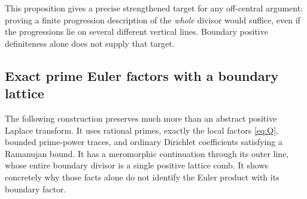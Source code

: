 This proposition gives a precise strengthened target for any off-central argument: proving a finite progression description of the \emph{whole} divisor would suffice, even if the progressions lie on several different vertical lines. Boundary positive definiteness alone does not supply that target.

\subsection{Exact prime Euler factors with a boundary lattice}

The following construction preserves much more than an abstract positive Laplace transform. It uses rational primes, exactly the local factors \eqref{eq:Q}, bounded prime-power traces, and ordinary Dirichlet coefficients satisfying a Ramanujan bound. It has a meromorphic continuation through its outer line, whose entire boundary divisor is a single positive lattice comb. It shows concretely why those facts alone do not identify the Euler product with its boundary factor.

